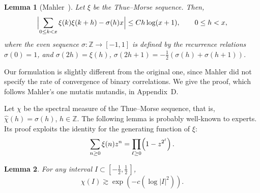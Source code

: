 \documentclass[11pt]{amsart}
\numberwithin{equation}{section}
\newtheorem{lemma}{Lemma}[section]
\newcommand{\bZ}{\mathbb Z}
\begin{document}
\begin{lemma}[Mahler~\cite{Mahler}]\label{Lemma:TM1}
Let $\xi$ be the Thue--Morse sequence. Then,
$$
\Bigl|\sum_{0\le k < x} \xi(k) \xi(k+h) - \sigma(h) x\Bigr| \le Ch \log(x+1),\qquad 0\le h< x,
$$
where the even sequence $\sigma\colon \bZ \to [-1, 1]$ is defined by the recurrence relations
$\sigma(0)=1$, and $\sigma(2h)=\xi(h)$,
$\sigma(2h+1)=-\frac12(\sigma(h)+\sigma(h+1))$.
\end{lemma}

Our formulation is slightly different from the original one, since Mahler did not specify
the rate of convergence of binary correlations. We give the proof, which follows
Mahler's one mutatis mutandis, in Appendix~D.

Let $\chi$ be the spectral measure of the Thue--Morse sequence, that is, $\widehat{\chi}(h)=\sigma(h)$, $h\in\bZ$. The following lemma is probably well-known to experts.
Its proof exploits the identity for the generating function of $\xi$:
\[
\sum_{n\ge 0} \xi(n) z^n  = \prod_{\ell\ge 0} \Bigl( 1 - z^{2^\ell} \Bigr)\,.
\]

\begin{lemma}\label{lemma:TM2}
For any interval $I\subset [-\tfrac12, \tfrac12\,]$,
\begin{equation}
\chi (I)\gtrsim \exp(-c(\log|I|^2)).
\label{ytr1}
\end{equation}
\end{lemma}
\end{document}
